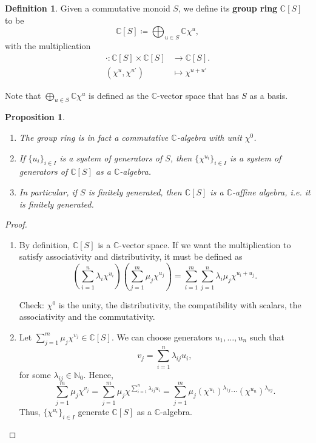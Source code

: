 \documentclass[12pt]{article}
\newtheorem*{proposition}{Proposition}
\theoremstyle{definition}
\newtheorem*{definition}{Definition}
\begin{document}
\begin{definition}
Given a commutative monoid $S$, we define its \textbf{group ring} $\mathbb{C}[S]$ to be
\[\mathbb{C}[S]\coloneqq\bigoplus_{u\in S}\mathbb{C}\chi^u,\]
with the multiplication
\begin{align*}
\cdot:\mathbb{C}[S]\times\mathbb{C}[S]&\longrightarrow\mathbb{C}[S].\\
(\chi^u,\chi^{u'})&\longmapsto\chi^{u+u'}
\end{align*}
\end{definition}

Note that $\bigoplus_{u\in S}\mathbb{C}\chi^u$ is defined as the $\mathbb{C}$-vector space that has $S$ as a basis.

\begin{proposition}
\begin{enumerate}[label=\arabic*)]
\item The group ring is in fact a commutative $\mathbb{C}$-algebra with unit $\chi^0$.

\item If $\{u_i\}_{i\in I}$ is a system of generators of $S$, then $\{\chi^{u_i}\}_{i\in I}$ is a system of generators of $\mathbb{C}[S]$ as a $\mathbb{C}$-algebra.

\item In particular, if $S$ is finitely generated, then $\mathbb{C}[S]$ is a $\mathbb{C}$-affine algebra, i.e. it is finitely generated.
\end{enumerate}
\end{proposition}

\begin{proof}
\begin{enumerate}[label=\arabic*)]
\item By definition, $\mathbb{C}[S]$ is a $\mathbb{C}$-vector space. If we want the multiplication to satisfy associativity and distributivity, it must be defined as
\[\left(\sum_{i=1}^n\lambda_i\chi^{u_i}\right)\left(\sum_{j=1}^m\mu_j\chi^{u_j}\right)=\sum_{i=1}^m\sum_{j=1}^n\lambda_i\mu_j\chi^{u_i+u_j}.\]

Check: $\chi^0$ is the unity, the distributivity, the compatibility with scalars, the associativity and the commutativity.

\item Let $\sum_{j=1}^m\mu_j\chi^{v_j}\in\mathbb{C}[S]$. We can choose generators $u_1,\ldots,u_n$ such that
\[v_j=\sum_{i=1}^n\lambda_{ij}u_i,\]
for some $\lambda_{ij}\in\mathbb{N}_0$.
Hence,
\[\sum_{j=1}^m\mu_j\chi^{v_j}=\sum_{j=1}^m\mu_j\chi^{\sum_{i=1}^n\lambda_{ij}u_i}=\sum_{j=1}^m\mu_j(\chi^{u_1})^{\lambda_{1j}}\cdots(\chi^{u_n})^{\lambda_{nj}}.\]
Thus, $\{\chi^{u_i}\}_{i\in I}$ generate $\mathbb{C}[S]$ as a $\mathbb{C}$-algebra.
\end{enumerate}
\end{proof}
\end{document}
